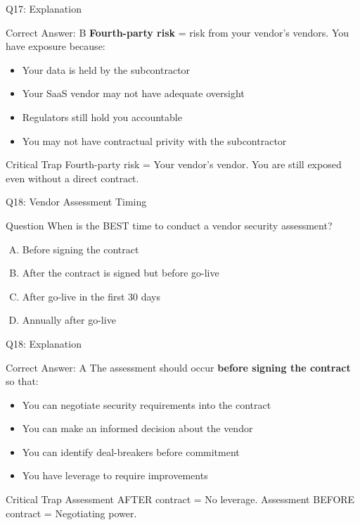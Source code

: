 \documentclass{beamer}
\begin{document}
	\begin{frame}{Q17: Explanation}
		\begin{block}{Correct Answer: B}
			\textbf{Fourth-party risk} = risk from your vendor's vendors. You have exposure because:
			\begin{itemize}
				\item Your data is held by the subcontractor
				\item Your SaaS vendor may not have adequate oversight
				\item Regulators still hold you accountable
				\item You may not have contractual privity with the subcontractor
			\end{itemize}
		\end{block}
		\begin{alertblock}{Critical Trap}
			Fourth-party risk = Your vendor's vendor.
			You are still exposed even without a direct contract.
		\end{alertblock}
	\end{frame}
	
	\begin{frame}{Q18: Vendor Assessment Timing}
		\begin{block}{Question}
			When is the BEST time to conduct a vendor security assessment?
		\end{block}
		\begin{enumerate}[(A)]
			\item Before signing the contract
			\item After the contract is signed but before go-live
			\item After go-live in the first 30 days
			\item Annually after go-live
		\end{enumerate}
	\end{frame}
	
	\begin{frame}{Q18: Explanation}
		\begin{block}{Correct Answer: A}
			The assessment should occur \textbf{before signing the contract} so that:
			\begin{itemize}
				\item You can negotiate security requirements into the contract
				\item You can make an informed decision about the vendor
				\item You can identify deal-breakers before commitment
				\item You have leverage to require improvements
			\end{itemize}
		\end{block}
		\begin{alertblock}{Critical Trap}
			Assessment AFTER contract = No leverage.
			Assessment BEFORE contract = Negotiating power.
		\end{alertblock}
	\end{frame}
	
\end{document}
